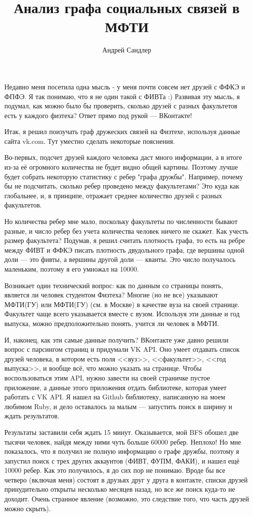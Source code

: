 \documentclass{article}
\title{Анализ графа социальных связей в МФТИ}
\author{Андрей Сандлер}
\begin{document}
\maketitle

Недавно меня посетила одна мысль - у меня почти совсем нет друзей с ФФКЭ и ФПФЭ. Я так понимаю, что я не один такой с ФИВТа :) Развивая эту
мысль, я подумал, как можно было бы проверить, сколько друзей с разных факультетов есть у каждого физтеха? Ответ прямо под рукой --- ВКонтакте!

Итак, я решил поизучать граф дружеских связей на Физтехе, используя данные сайта vk.com. Тут уместно сделать некоторые пояснения.

Во-первых, подсчет друзей каждого человека даст много информации, а в итоге из-за её огромного количества не будет видно общей картины.
Поэтому лучше будет собрать некоторую статистику с ребер "графа дружбы". Например, почему бы не подсчитать, сколько ребер проведено между
факультетами? Это куда как глобальнее, и, в принципе, отражает среднее количество друзей с разных факультетов.

Но количества ребер мне мало, поскольку факультеты по численности бывают разные, и число ребер без учета количества человек ничего не
скажет. Как учесть размер факультета? Подумав, я решил считать плотность графа, то есть на ребре между ФИВТ и ФФКЭ писать плотность
двудольного графа, где вершины одной доли --- это фивты, а вершины другой доли --- кванты. Это число получалось маленьким, поэтому я его умножал
на 10000.

Возникает один технический вопрос: как по данным со страницы понять, является ли человек студентом Физтеха? Многие (но не все) указывают
МФТИ(ГУ) или МФТИ(ГУ) (см. в Москве) в качестве вуза на своей странице. Факультет чаще всего указывается вместе с вузом. Используя эти данные
и год выпуска, можно предположительно понять, учится ли человек в МФТИ.

И, наконец, как эти самые данные получить? ВКонтакте уже давно решили вопрос с парсингом страниц и придумали VK API. Оно умеет отдавать
список друзей человека, в котором есть поля <<вуз>>, <<факультет>>, <<год выпуска>>, и вообще всё, что можно указать на странице. Чтобы
воспользоваться этим API, нужно завести на своей страничке пустое приложение, а данные этого приложения отдать библиотеке, которая умеет
работать с VK API. Я нашел на Github библиотеку, написанную на моем любимом Ruby, и дело оставалось за малым --- запустить поиск в ширину и
ждать результатов.

Результаты заставили себя ждать 15 минут. Оказывается, мой BFS обошел две тысячи человек, найдя между ними чуть больше 60000 ребер. Неплохо!
Но мне показалось, что я получил не полную информацию о графе дружбы, поэтому я запустил поиск с трех других аккаунтов (ФИВТ, ФУПМ, ФАКИ), и
нашел ещё 10000 ребер. Как это получилось, я до сих пор не понимаю. Вроде бы все четверо (включая меня) состоят в друзьях друг у друга в
контакте, списки друзей принудительно открыты несколько месяцев назад, но все же поиск куда-то не доходит. Очень странное явление (возможно,
это следствие того, что часть друзей можно скрыть).
\end{document}
